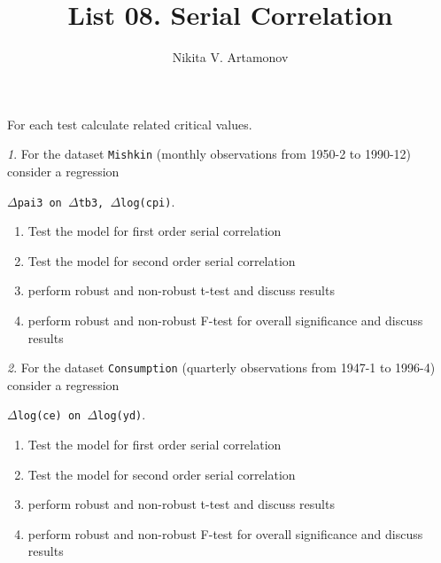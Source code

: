 \documentclass[12pt]{article}
\title{List 08. Serial Correlation}
\author{Nikita V. Artamonov}
\theoremstyle{remark}
\newtheorem{problem}{}[section]
\begin{document}
\maketitle



For each test calculate related critical values.

\begin{problem}
For the dataset \texttt{Mishkin} (monthly observations from 1950-2 to 1990-12) consider a regression
\begin{center}
	\texttt{$\Delta$pai3 on $\Delta$tb3, $\Delta$log(cpi)}.
\end{center}
\begin{enumerate}
	\item Test the model for first order serial correlation
	\item Test the model for second order serial correlation
	\item perform robust and non-robust t-test and discuss results
	\item perform robust and non-robust F-test for overall significance and discuss results
\end{enumerate}
\end{problem}

\begin{problem}
For the dataset \texttt{Consumption} (quarterly observations from 1947-1 to 1996-4) consider a regression
\begin{center}
	\texttt{$\Delta$log(ce) on $\Delta$log(yd)}.
\end{center}
\begin{enumerate}
	\item Test the model for first order serial correlation
	\item Test the model for second order serial correlation
	\item perform robust and non-robust t-test and discuss results
	\item perform robust and non-robust F-test for overall significance and discuss results
\end{enumerate}
\end{problem}
\end{document}
